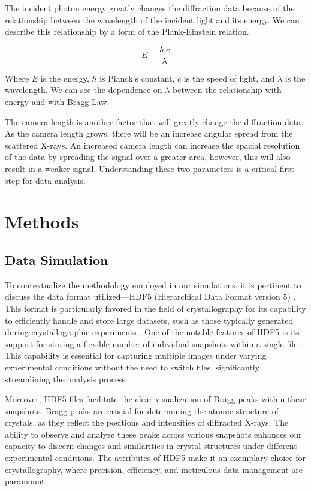 \documentclass[12pt]{article}
\begin{document}
The incident photon energy greatly changes the diffraction data because of the relationship between the wavelength of the incident light and its energy. We can describe this relationship by a form of the Plank-Einstein relation.

\begin{equation}
    E = \frac{\hbar\ c}{\lambda}
\end{equation}

Where \(E\) is the energy, \(\hbar\) is Planck's constant, \(c\) is the speed of light, and $\lambda$ is the wavelength. We can see the dependence on $\lambda$ between the relationship with energy and with Bragg Law.

The camera length is another factor that will greatly change the diffraction data. As the camera length grows, there will be an increase angular spread from the scattered X-rays. An increased camera length can increase the spacial resolution of the data by spreading the signal over a greater area, however, this will also result in a weaker signal. Understanding these two parameters is a critical first step for data analysis. 


\section{Methods}

\subsection{Data Simulation}

To contextualize the methodology employed in our simulations, it is pertinent to discuss the data format utilized—HDF5 (Hierarchical Data Format version 5) \cite{lochdf5}. This format is particularly favored in the field of crystallography for its capability to efficiently handle and store large datasets, such as those typically generated during crystallographic experiments \cite{hdf5}. One of the notable features of HDF5 is its support for storing a flexible number of individual snapshots within a single file \cite{hdf5}. This capability is essential for capturing multiple images under varying experimental conditions without the need to switch files, significantly streamlining the analysis process \cite{hdf5}.

Moreover, HDF5 files facilitate the clear visualization of Bragg peaks within these snapshots. Bragg peaks are crucial for determining the atomic structure of crystals, as they reflect the positions and intensities of diffracted X-rays. The ability to observe and analyze these peaks across various snapshots enhances our capacity to discern changes and similarities in crystal structures under different experimental conditions. The attributes of HDF5 make it an exemplary choice for crystallography, where precision, efficiency, and meticulous data management are paramount.
\end{document}
